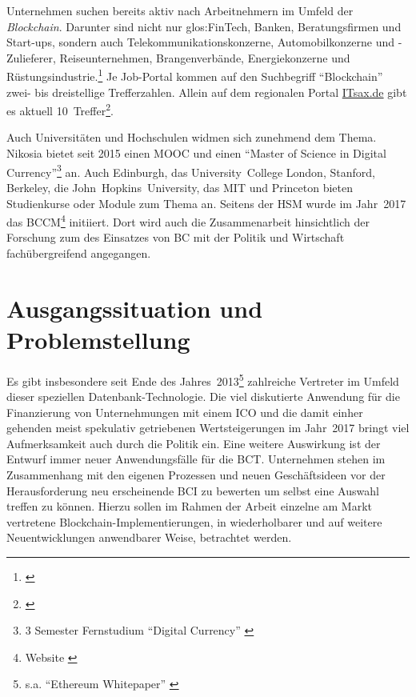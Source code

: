 Unternehmen suchen bereits aktiv nach Arbeitnehmern im Umfeld der \emph{Blockchain}.
Darunter sind nicht nur \gls{glos:FinTech}, Banken, Beratungsfirmen und Start-ups, sondern auch Telekommunikationskonzerne, Automobilkonzerne und -Zulieferer, Reiseunternehmen, Brangenverbände, Energiekonzerne und Rüstungsindustrie.\footnote{\cite{w:jobsearch-bc-stepstone}}
Je Job-Portal kommen auf den Suchbegriff \enquote{Blockchain} zwei- bis dreistellige Trefferzahlen.
Allein auf dem regionalen Portal \href{https://www.itsax.de/}{ITsax.de} gibt es aktuell 10~Treffer\footnote{\cite{w:jobsearch-bc-itsax}}.

Auch Universitäten und Hochschulen widmen sich zunehmend dem Thema. Nikosia bietet \ua{} seit 2015 einen \gls{MOOC} und einen \enquote{Master of Science in Digital Currency}\footnote{3 Semester Fernstudium \enquote{Digital Currency} \autocite{w:unic-master-dc}} an. Auch Edinburgh, das \mbox{University College} London, Stanford, Berkeley, die \mbox{John Hopkins University}, das \gls{MIT} und Princeton bieten Studienkurse oder Module zum Thema an. 
Seitens der \gls{HSM} wurde im Jahr~2017 das \gls{BCCM}\footnote{Website \autocite{w:bccm}} initiiert. Dort wird auch die Zusammenarbeit hinsichtlich der Forschung zum des Einsatzes von \gls{BC} mit der Politik und Wirtschaft fachübergreifend angegangen.

\newpage
\section{Ausgangssituation und Problemstellung}\label{sec:problemstellung}

Es gibt insbesondere seit Ende des Jahres~2013\footnote{s.a. \enquote{Ethereum Whitepaper} \autocite{p:ethereum}} zahlreiche Vertreter im Umfeld dieser speziellen Datenbank-Technologie.
Die viel diskutierte Anwendung für die Finanzierung von Unternehmungen mit einem \gls{ICO} und die damit einher gehenden meist spekulativ getriebenen Wertsteigerungen im Jahr~2017 bringt viel Aufmerksamkeit auch durch die Politik ein.
Eine weitere Auswirkung ist der Entwurf immer neuer Anwendungsfälle für die \gls{BCT}.
Unternehmen stehen im Zusammenhang mit den eigenen Prozessen und neuen Geschäftsideen vor der Herausforderung neu erscheinende \gls{BCI} zu bewerten um selbst eine Auswahl treffen zu können.
Hierzu sollen im Rahmen der Arbeit einzelne am Markt vertretene Blockchain-Implementierungen, in wiederholbarer und auf weitere Neuentwicklungen anwendbarer Weise, betrachtet werden.

